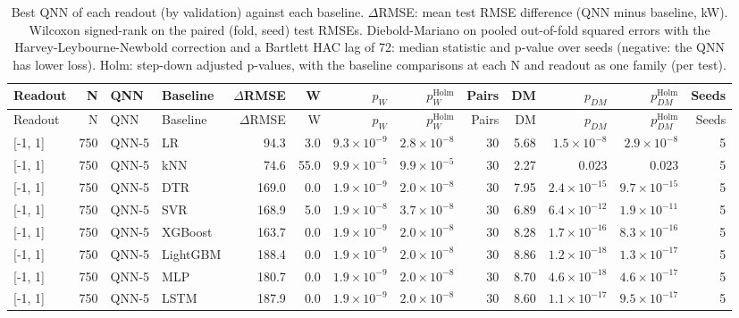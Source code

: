\begin{longtable}{lrllrrrrrrrrr}
\caption{Best QNN of each readout (by validation) against each baseline. $\Delta$RMSE: mean test RMSE difference (QNN minus baseline, kW). Wilcoxon signed-rank on the paired (fold, seed) test RMSEs. Diebold-Mariano on pooled out-of-fold squared errors with the Harvey-Leybourne-Newbold correction and a Bartlett HAC lag of 72: median statistic and p-value over seeds (negative: the QNN has lower loss). Holm: step-down adjusted p-values, with the baseline comparisons at each N and readout as one family (per test).}\label{tab:t6} \\
\toprule
Readout & N & QNN & Baseline & $\Delta$RMSE & W & $p_W$ & $p_W^{\mathrm{Holm}}$ & Pairs & DM & $p_{DM}$ & $p_{DM}^{\mathrm{Holm}}$ & Seeds \\
\midrule
\endfirsthead
\toprule
Readout & N & QNN & Baseline & $\Delta$RMSE & W & $p_W$ & $p_W^{\mathrm{Holm}}$ & Pairs & DM & $p_{DM}$ & $p_{DM}^{\mathrm{Holm}}$ & Seeds \\
\midrule
\endhead
\bottomrule
\endlastfoot
{[-1, 1]} & 750 & QNN-5 & LR & 94.3 & 3.0 & $9.3 \times 10^{-9}$ & $2.8 \times 10^{-8}$ & 30 & 5.68 & $1.5 \times 10^{-8}$ & $2.9 \times 10^{-8}$ & 5 \\
{[-1, 1]} & 750 & QNN-5 & kNN & 74.6 & 55.0 & $9.9 \times 10^{-5}$ & $9.9 \times 10^{-5}$ & 30 & 2.27 & 0.023 & 0.023 & 5 \\
{[-1, 1]} & 750 & QNN-5 & DTR & 169.0 & 0.0 & $1.9 \times 10^{-9}$ & $2.0 \times 10^{-8}$ & 30 & 7.95 & $2.4 \times 10^{-15}$ & $9.7 \times 10^{-15}$ & 5 \\
{[-1, 1]} & 750 & QNN-5 & SVR & 168.9 & 5.0 & $1.9 \times 10^{-8}$ & $3.7 \times 10^{-8}$ & 30 & 6.89 & $6.4 \times 10^{-12}$ & $1.9 \times 10^{-11}$ & 5 \\
{[-1, 1]} & 750 & QNN-5 & XGBoost & 163.7 & 0.0 & $1.9 \times 10^{-9}$ & $2.0 \times 10^{-8}$ & 30 & 8.28 & $1.7 \times 10^{-16}$ & $8.3 \times 10^{-16}$ & 5 \\
{[-1, 1]} & 750 & QNN-5 & LightGBM & 188.4 & 0.0 & $1.9 \times 10^{-9}$ & $2.0 \times 10^{-8}$ & 30 & 8.86 & $1.2 \times 10^{-18}$ & $1.3 \times 10^{-17}$ & 5 \\
{[-1, 1]} & 750 & QNN-5 & MLP & 180.7 & 0.0 & $1.9 \times 10^{-9}$ & $2.0 \times 10^{-8}$ & 30 & 8.70 & $4.6 \times 10^{-18}$ & $4.6 \times 10^{-17}$ & 5 \\
{[-1, 1]} & 750 & QNN-5 & LSTM & 187.9 & 0.0 & $1.9 \times 10^{-9}$ & $2.0 \times 10^{-8}$ & 30 & 8.60 & $1.1 \times 10^{-17}$ & $9.5 \times 10^{-17}$ & 5 \\

\end{longtable}
